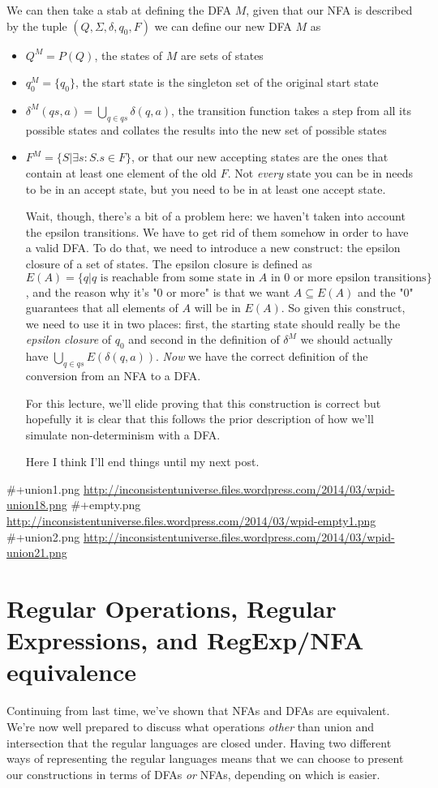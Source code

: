 \documentclass[11pt]{article}
\begin{document}
We can then take a stab at defining the DFA $M$, given that our NFA is described by the tuple $(Q,\Sigma,\delta,q_0,F)$ we can define  our new DFA $M$ as 

\begin{itemize}
\item $Q^M = P(Q)$, the states of $M$ are sets of states
\item $q^M_0 = \{ q_0 \}$, the start state is the singleton set of the original start state
\item $\delta^M(qs,a) = \bigcup_{q \in qs} \delta(q,a)$, the transition function takes a step from all its possible states and collates the results into the new set of possible states
\item $F^M = \{S | \exists s : S. s \in F\}$, or that our new accepting states are the ones that contain at least one element of the old $F$. Not \emph{every} state you can be in needs to be in an accept state, but you need to be in at least one accept state.

Wait, though, there's a bit of a problem here: we haven't taken into account the epsilon transitions. We have to get rid of them somehow in order to have a valid DFA. To do that, we need to introduce a new construct: the epsilon closure of a set of states. The epsilon closure is defined as $E(A) = \{q | q \text{ is reachable from some state in } A \text{ in 0 or more epsilon transitions}\}$, and the reason why it's "0 or more" is that we want $A \subseteq E(A)$ and the "0" guarantees that all elements of $A$ will be in $E(A)$. So given this construct, we need to use it in two places: first, the starting state should really be the \emph{epsilon closure} of $q_0$ and second in the definition of $\delta^M$ we should actually have $\bigcup_{q \in qs} E(\delta(q,a))$. \emph{Now} we have the correct definition of the conversion from an NFA to a DFA. 

For this lecture, we'll elide proving that this construction is correct but hopefully it is clear that this follows the prior description of how we'll simulate non-determinism with a DFA. 

Here I think I'll end things until my next post.
\end{itemize}
\#+union1.png \url{http://inconsistentuniverse.files.wordpress.com/2014/03/wpid-union18.png}
\#+empty.png \url{http://inconsistentuniverse.files.wordpress.com/2014/03/wpid-empty1.png}
\#+union2.png \url{http://inconsistentuniverse.files.wordpress.com/2014/03/wpid-union21.png}
\section{Regular Operations, Regular Expressions, and RegExp/NFA equivalence}
\label{sec-4}
Continuing from last time, we've shown that NFAs and DFAs are equivalent. We're now well prepared to discuss what operations \emph{other} than union and intersection that the regular languages are closed under. Having two different ways of representing the regular languages means that we can choose to present our constructions in terms of DFAs \emph{or} NFAs, depending on which is easier. 
\end{document}
